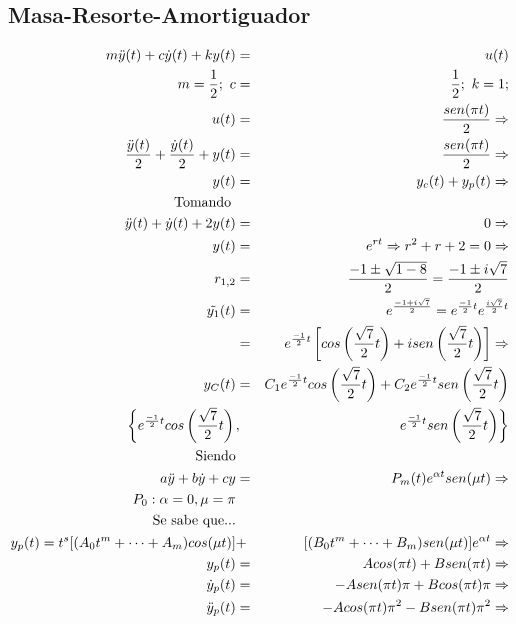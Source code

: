 \documentclass[12pt,spanish,lettersize]{report}
\begin{document}
\subsection{Masa-Resorte-Amortiguador}
\begin{eqnarray}
m\ddot{y}(t)+c\dot{y}(t)+ky(t)&=&u(t)\\
\nonumber m=\frac{1}{2};\ c&=&\frac{1}{2};\ k=1;\\
\nonumber u(t)&=&\frac{sen(\pi t)}{2}\Rightarrow\\
\nonumber\frac{\ddot{y}(t)}{2}+\frac{\dot{y}(t)}{2}+y(t)&=&\frac{sen(\pi t)}{2}\Rightarrow\\
\nonumber y(t)&=&y_c(t)+y_p(t)\Rightarrow\\
\nonumber\textnormal{Tomando }\\
\nonumber\ddot{y}(t)+\dot{y}(t)+2y(t)&=&0\Rightarrow\\
\nonumber y(t)&=&e^{rt}\Rightarrow r^2+r+2=0\Rightarrow\\
\nonumber r_{1,2}&=&\frac{-1\pm\sqrt{1-8}}{2}=\frac{-1\pm i\sqrt{7}}{2}\\
\nonumber\tilde{y_1}(t)&=&{e}^{\frac{-1+i\sqrt{7}}{2}}=e^{\frac{-1}{2}t}e^{\frac{i\sqrt{7}}{2}t}\\
\nonumber &=&e^{\frac{-1}{2}t}\left[cos\left(\frac{\sqrt{7}}{2}t\right)+isen\left(\frac{\sqrt{7}}{2}t\right)\right]\Rightarrow\\
\nonumber y_C(t)&=&C_1e^{\frac{-1}{2}t}cos\left(\frac{\sqrt{7}}{2}t\right)+C_2e^{\frac{-1}{2}t}sen\left(\frac{\sqrt{7}}{2}t\right)\\
\nonumber\left\{e^{\frac{-1}{2}t}cos\left(\frac{\sqrt{7}}{2}t\right)\right. &,&\left. e^{\frac{-1}{2}t}sen\left(\frac{\sqrt{7}}{2}t\right)\right\}\\
\nonumber\textnormal{Siendo}\\
\nonumber a\ddot{y}+b\dot{y}+cy&=&P_m(t)e^{\alpha t}sen(\mu t)\Rightarrow\\
\nonumber P_0: \alpha=0, \mu=\pi\\
\nonumber\textnormal{Se sabe que...}\\
\nonumber y_p(t)=t^s[(A_0t^m+\dots+A_m)cos(\mu t)]&+&[(B_0t^m+\dots+B_m)sen(\mu t)]e^{\alpha t}\Rightarrow\\
\nonumber y_p(t)&=&Acos(\pi t)+Bsen(\pi t)\Rightarrow\\
\nonumber \dot{y}_p(t)&=&-Asen(\pi t)\pi+Bcos(\pi t)\pi\Rightarrow\\
\nonumber \ddot{y}_p(t)&=&-Acos(\pi t)\pi^2-Bsen(\pi t)\pi^2\Rightarrow\\
\end{eqnarray}
\end{document}
